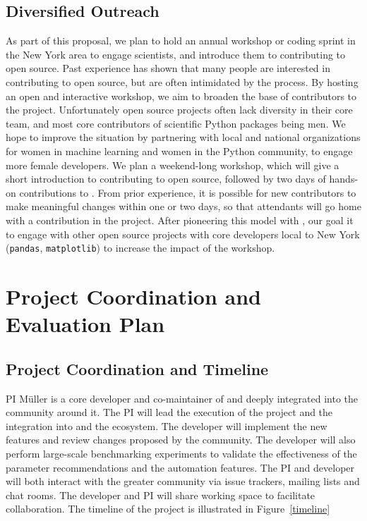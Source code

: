 \subsection{Diversified Outreach}
As part of this proposal, we plan to hold an annual workshop or coding sprint
in the New York area to engage scientists, and introduce them to contributing
to open source. Past experience has shown that many people are interested
in contributing to open source, but are often intimidated by the process.
By hosting an open and interactive workshop, we aim to broaden the base
of contributors to the \sklearn{} project.
Unfortunately open source projects often lack diversity in their core team,
and most core contributors of scientific Python packages being men.
We hope to improve the situation by partnering with local and national
organizations for women in machine learning and women in the Python community,
to engage more female developers.
We plan a weekend-long workshop, which will give a short introduction to
contributing to open source, followed by two days of hands-on contributions to
\sklearn{}.
From prior experience, it is possible for new contributors to make meaningful
changes within one or two days, so that attendants will go home with a
contribution in the project. After pioneering this model with \sklearn{}, our
goal it to engage with other open source projects with core developers local to
New York (\texttt{pandas}, \texttt{matplotlib}) to increase the impact of the
workshop.

\section{Project Coordination and Evaluation Plan}
\subsection{Project Coordination and Timeline}
PI M\"uller is a core developer and co-maintainer of \sklearn{} and deeply integrated
into the community around it. The PI will lead the execution of the project and the integration
into \sklearn{} and the \sklearn{} ecosystem.
The developer will implement the new features and review changes proposed by
the \sklearn{} community. The developer will also perform large-scale
benchmarking experiments to validate the effectiveness of the parameter
recommendations and the automation features.  The PI and developer will both
interact with the greater community via issue trackers, mailing lists and
chat rooms. The developer and PI will share working space to facilitate
collaboration. The timeline of the project is illustrated in Figure~\ref{timeline}

